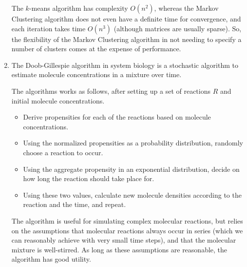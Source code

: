 \begin{enumerate}[label=(\alph*)]
The $k$-means algorithm has complexity $O(n^2)$, whereas the Markov Clustering algorithm does not even have a definite time for convergence, and each iteration takes time $O(n^3)$ (although matrices are usually sparse). So, the flexibility of the Markov Clustering algorithm in not needing to specify a number of clusters comes at the expense of performance.

\item
  The Doob-Gillespie algorithm in system biology is a stochastic algorithm to estimate molecule concentrations in a mixture over time.

  The algorithms works as follows, after setting up a set of reactions $R$ and initial molecule concentrations.

  \begin{itemize}
    \item
      Derive propensities for each of the reactions based on molecule concentrations.

    \item
      Using the normalized propensities as a probability distribution, randomly choose a reaction to occur.

    \item
      Using the aggregate propensity in an exponential distribution, decide on how long the reaction should take place for.

    \item
      Using these two values, calculate new molecule densities according to the reaction and the time, and repeat.
  \end{itemize}

  The algorithm is useful for simulating complex molecular reactions, but relies on the assumptions that molecular reactions always occur in series (which we can reasonably achieve with very small time steps), and that the molecular mixture is well-stirred. As long as these assumptions are reasonable, the algorithm has good utility.

        
\end{enumerate}


